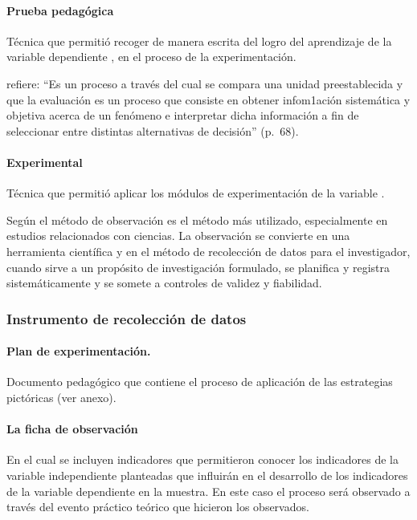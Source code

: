 \documentclass[12pt,a4paper]{article}
\begin{document}
\paragraph{Prueba pedagógica} Técnica que permitió recoger de manera escrita del  \MakeTextLowercase{\variablei} logro del aprendizaje de la variable dependiente \MakeTextLowercase{\variabled}, en el proceso de la experimentación.

\cite{hernandez_sampieri_metodologiinvestigacion_2014} refiere: ``Es un proceso a través del cual se compara una unidad preestablecida y que la evaluación es un proceso que consiste en obtener infom1ación sistemática y objetiva acerca de un fenómeno e interpretar dicha información a fin de seleccionar entre distintas alternativas de decisión'' (p.~68).

\paragraph{Experimental} Técnica que permitió aplicar los módulos de experimentación de la variable \variablei.


{Según \cite{kothari_research_2004} el método de observación es el método más utilizado, especialmente en estudios relacionados con ciencias. La observación se convierte en una herramienta científica y en el método de recolección de datos para el investigador, cuando sirve a un propósito de investigación formulado, se planifica y registra sistemáticamente y se somete a controles de validez y fiabilidad.}

\subsubsection{Instrumento de recolección de datos}

\paragraph{Plan de experimentación.} Documento pedagógico que contiene el proceso de aplicación de las estrategias pictóricas (ver anexo).

\paragraph{La ficha de observación} En el cual se incluyen indicadores que permitieron conocer  los indicadores de la variable independiente planteadas que influirán en el desarrollo de los indicadores de la variable dependiente en la muestra. En este caso el proceso será observado a través del evento práctico teórico que hicieron los observados.
\end{document}
